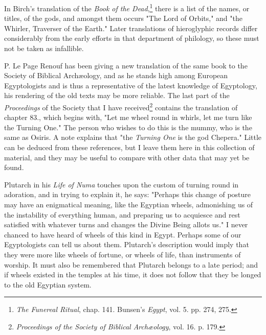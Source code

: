 \documentclass[a4paper, 11pt, oneside, polutonikogreek, english]{article}
\begin{document}
In Birch's translation of the \emph{Book of the Dead},\footnote{\emph{The Funereal Ritual}, chap. 141. Bunsen's \emph{Egypt}, vol. 5. pp. 274, 275.} there is a list of the names, or titles, of the gods, and amongst them occurs "The Lord of Orbits," and "the Whirler, Traverser of the Earth." Later translations of hieroglyphic records differ considerably from the early efforts in that department of philology, so these must not be taken as infallible.

P. Le Page Renouf has been giving a new translation of the same book to the Society of Biblical Archæology, and as he stands high among European Egyptologists and is thus a representative of the latest knowledge of Egyptology, his rendering of the old texts may be more reliable. The last part of the \emph{Proceedings} of the Society that I have received\footnote{\emph{Proceedings of the Society of Biblical Archæology}, vol. 16. p. 179.} contains the translation of chapter 83., which begins with, "Let me wheel round in whirls, let me turn like the Turning One." The person who wishes to do this is the mummy, who is the same as Osiris. A note explains that "the \emph{Turning One} is the god Chepera." Little can be deduced from these references, but I leave them here in this collection of material, and they may be useful to compare with other data that may yet be found.

Plutarch in his \emph{Life of Numa} touches upon the custom of turning round in adoration, and in trying to explain it, he says: "Perhaps this change of posture may have an enigmatical meaning, like the Egyptian wheels, admonishing us of the instability of everything human, and preparing us to acquiesce and rest satisfied with whatever turns and changes the Divine Being allots us." I never chanced to have heard of wheels of this kind in Egypt. Perhaps some of our Egyptologists can tell us about them. Plutarch's description would imply that they were more like wheels of fortune, or wheels of life, than instruments of worship. It must also be remembered that Plutarch belongs to a late period; and if wheels existed in the temples at his time, it does not follow that they be longed to the old Egyptian system.
\end{document}
